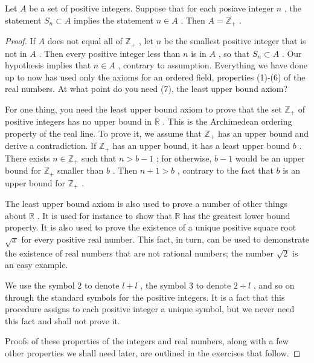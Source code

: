 \begin{theorem} Let \(A\) be a set of positive integers. Suppose that for each posiave integer \(n\) , the statement \({S}_{n} \subset  A\) implies the statement \(n \in  A\) . Then \(A = {\mathbb{Z}}_{ + }\) .
\end{theorem}

\begin{proof}If \(A\) does not equal all of \({\mathbb{Z}}_{ + }\) , let \(n\) be the smallest positive integer that is not in \(A\) . Then every positive integer less than \(n\) is in \(A\) , so that \({S}_{n} \subset  A\) . Our hypothesis implies that \(n \in  A\) , contrary to assumption.
Everything we have done up to now has used only the axioms for an ordered field, properties (1)-(6) of the real numbers. At what point do you need (7), the least upper bound axiom?

For one thing, you need the least upper bound axiom to prove that the set \({\mathbb{Z}}_{ + }\) of positive integers has no upper bound in \(\mathbb{R}\) . This is the Archimedean ordering property of the real line. To prove it, we assume that \({\mathbb{Z}}_{ + }\) has an upper bound and derive a contradiction. If \({\mathbb{Z}}_{ + }\) has an upper bound, it has a least upper bound \(b\) . There exists \(n \in  {\mathbb{Z}}_{ + }\) such that \(n > b - 1\) ; for otherwise, \(b - 1\) would be an upper bound for \({\mathbb{Z}}_{ + }\) smaller than \(b\) . Then \(n + 1 > b\) , contrary to the fact that \(b\) is an upper bound for \({\mathbb{Z}}_{ + }\) .

The least upper bound axiom is also used to prove a number of other things about \(\mathbb{R}\) . It is used for instance to show that \(\mathbb{R}\) has the greatest lower bound property. It is also used to prove the existence of a unique positive square root \(\sqrt{x}\) for every positive real number. This fact, in turn, can be used to demonstrate the existence of real numbers that are not rational numbers; the number \(\sqrt{2}\) is an easy example.

We use the symbol 2 to denote \(l + l\) , the symbol 3 to denote \(2 + l\) , and so on through the standard symbols for the positive integers. It is a fact that this procedure assigns to each positive integer a unique symbol, but we never need this fact and shall not prove it.

Proofs of these properties of the integers and real numbers, along with a few other properties we shall need later, are outlined in the exercises that follow.
\end{proof}
